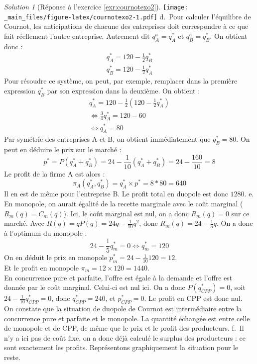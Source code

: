 \documentclass[
]{book}
\theoremstyle{definition}
\theoremstyle{definition}
\theoremstyle{definition}
\theoremstyle{definition}
\theoremstyle{remark}
\newtheorem*{solution}{Solution}
\begin{document}
\begin{solution}[Réponse à l'exercice \ref{exr:cournotexo2}]
\texttt{[image: \_main\_files/figure-latex/cournotexo2-1.pdf]}
d.~Pour calculer l'équilibre de Cournot, les anticipations de chacune des entreprises doit correspondre à ce que fait réellement l'autre entreprise.
Autrement dit \(q_A^a=q_A^*\) et \(q_B^a=q_B^*\).
On obtient donc :
\begin{gather*}
q_A^*=120-\frac{1}{2}q_B^*\\
q_B^*=120-\frac{1}{2}q_A^*
\end{gather*}
Pour résoudre ce système, on peut, par exemple, remplacer dans la première expression \(q_B^*\) par son expression dans la deuxième.
On obtient :
\begin{gather*}
q_A^*=120-\frac{1}{2}\left(120-\frac{1}{2}q_A^*\right) \\
\Leftrightarrow \frac{3}{4}q_A^*=120-60\\
\Leftrightarrow q_A^*=80
\end{gather*}
Par symétrie des entreprises A et B, on obtient immédiatement que \(q_B^*=80\).
On peut en déduire le prix sur le marché :
\[p^*=P(q_A^*+q_B^*)=24-\frac{1}{10}(q_A^*+q_B^*)=24-\frac{160}{10}=8\]
Le profit de la firme A est alors :
\[\pi_A(q_A^*, q_B^*)=q_A^*\times p^*=8*80=640\]
Il en est de même pour l'entreprise B.
Le profit total en duopole est donc \(1280\).
e. En monopole, on aurait égalité de la recette marginale avec le coût marginal (\(R_m(q)=C_m(q)\)).
Ici, le coût marginal est nul, on a donc \(R_m(q)=0\) sur ce marché.
Avec \(R(q)=qP(q)=24q-\frac{1}{10}q^2\), donc \(R_m(q)=24-\frac{1}{5}q\).
On a donc à l'optimum du monopole :
\[24-\frac{1}{5}q^*_m=0\Leftrightarrow q_m^*=120\]
On en déduit le prix en monopole \(p_m^*=24-\frac{1}{10}120=12\).\\
Et le profit en monopole \(\pi_m=12\times 120=1440\).\\
En concurrence pure et parfaite, l'offre est égale à la demande et l'offre est donnée par le coût marginal.
Celui-ci est nul ici.
On a donc \(P(q^*_{CPP})=0\), soit \(24-\frac{1}{10}q^*_{CPP}=0\), donc \(q_{CPP}^*=240\), et \(p_{CPP}^*=0\).
Le profit en CPP est donc nul.\\
On constate que la situation de duopole de Cournot est intermédiaire entre la concurrence pure et parfaite et le monopole.
La quantité échangée est entre celle de monopole et de CPP, de même que le prix et le profit des producteurs.
f.~Il n'y a ici pas de coût fixe, on a donc déjà calculé le surplus des producteurs : ce sont exactement les profits.
Représentons graphiquement la situation pour le reste.


\end{solution}
\end{document}

